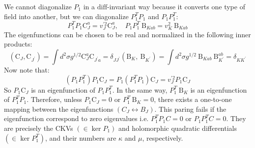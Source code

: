 We cannot diagonalize $P_{1}$ in a $\text{diff}$-invariant way because it converts one type of field into another, but we can diagonalize $P_{1}^{T} P_{1}$ and $P_{1} P_{1}^{T}$:
\begin{equation}
	P_{1}^{T} P_{1} \mathrm{C}_{J}^{a}=v_{J}^{\prime 2} \mathrm{C}_{J}^{a}, \quad P_{1} P_{1}^{T} \mathrm{~B}_{K a b}=v_{K}^{2} \mathrm{~B}_{K a b}
\end{equation}
The eigenfunctions can be chosen to be real and normalized in the following inner products:
\begin{subequations}
	\begin{equation}
		\left(\mathrm{C}_{J}, \mathrm{C}_{J^{\prime}}\right) =\int d^{2} \sigma g^{1 / 2} \mathrm{C}_{J}^{a} \mathrm{C}_{J^{\prime} a}=\delta_{J J^{\prime}} 
	\end{equation}
	\begin{equation}
		\left(\mathrm{B}_{K}, \mathrm{~B}_{K^{\prime}}\right) =\int d^{2} \sigma g^{1 / 2} \mathrm{~B}_{K a b} \mathrm{~B}_{K^{\prime}}^{a b}=\delta_{K K^{\prime}}
	\end{equation}
\end{subequations}
Now note that:
\begin{equation}
	\left(P_{1} P_{1}^{T}\right) P_{1} \mathrm{C}_{J}=P_{1}\left(P_{1}^{T} P_{1}\right) \mathrm{C}_{J}=v_{J}^{\prime 2} P_{1} \mathrm{C}_{J}
\end{equation}
So $P_{1} \mathrm{C}_{J}$ is an eigenfunction of $P_{1} P_{1}^{T}$. In the same way, $P_{1}^{T} \mathrm{~B}_{K}$ is an eigenfunction of $P_{1}^{T} P_{1}$. Therefore, unless $P_{1} \mathrm{C}_{J}=0$ or $P_{1}^{T} \mathrm{~B}_{K}=0$, there exists a one-to-one mapping between the eigenfunctions $(C_J\leftrightarrow B_J)$. This paring fails if the eigenfunction correspond to zero eigenvalues i.e. $P_{1}^{T} P_{1}C=0$ or $P_{1} P_{1}^{T}C=0$. They are precisely the CKVs $(\in \ker P_1)$ and holomorphic quadratic differentials $(\in \ker P^{T}_1)$, and their numbers are $\kappa$ and $\mu$, respectively.

